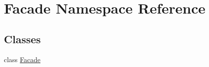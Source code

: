 \hypertarget{namespace_facade}{}\section{Facade Namespace Reference}
\label{namespace_facade}
\subsection*{Classes}
\begin{DoxyCompactItemize}
\item 
class \mbox{\hyperlink{class_facade_1_1_facade}{Facade}}
\end{DoxyCompactItemize}
